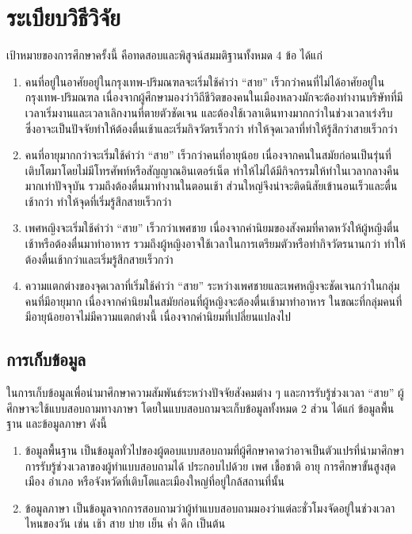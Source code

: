 \documentclass[a4paper]{article}
\begin{document}
\section{ระเบียบวิธีวิจัย}
    เป้าหมายของการศึกษาครั้งนี้ คือทดสอบและพิสูจน์สมมติฐานทั้งหมด 4 ข้อ ได้แก่
    \begin{enumerate}
        \item คนที่อยู่ในอาศัยอยู่ในกรุงเทพ-ปริมณฑลจะเริ่มใช้คำว่า “สาย” เร็วกว่าคนที่ไม่ได้อาศัยอยู่ในกรุงเทพ-ปริมณฑล เนื่องจากผู้ศึกษามองว่าวิถีชีวิตของคนในเมืองหลวงมักจะต้องทำงานบริษัทที่มีเวลาเริ่มงานและเวลาเลิกงานที่ตายตัวชัดเจน และต้องใช้เวลาเดินทางมากกว่าในช่วงเวลาเร่งรีบ ซึ่งอาจะเป็นปัจจัยทำให้ต้องตื่นเช้าและเริ่มกิจวัตรเร็วกว่า ทำให้จุดเวลาที่ทำให้รู้สึกว่าสายเร็วกว่า
        \item คนที่อายุมากกว่าจะเริ่มใช้คำว่า “สาย” เร็วกว่าคนที่อายุน้อย เนื่องจากคนในสมัยก่อนเป็นรุ่นที่เติบโตมาโดยไม่มีโทรศัพท์หรือสัญญาณอินเตอร์เน็ต ทำให้ไม่ได้มีกิจกรรมให้ทำในเวลากลางคืนมากเท่าปัจจุบัน รวมถึงต้องตื่นมาทำงานในตอนเช้า ส่วนใหญ่จึงน่าจะติดนิสัยเข้านอนเร็วและตื่นเช้ากว่า ทำให้จุดที่เริ่มรู้สึกสายเร็วกว่า
        \item เพศหญิงจะเริ่มใช้คำว่า “สาย” เร็วกว่าเพศชาย เนื่องจากค่านิยมของสังคมที่คาดหวังให้ผู้หญิงตื่นเช้าหรือต้องตื่นมาทำอาหาร รวมถึงผู้หญิงอาจใช้เวลาในการเตรียมตัวหรือทำกิจวัตรนานกว่า ทำให้ต้องตื่นเช้ากว่าและเริ่มรู้สึกสายเร็วกว่า
        \item ความแตกต่างของจุดเวลาที่เริ่มใช้คำว่า “สาย” ระหว่างเพศชายและเพศหญิงจะชัดเจนกว่าในกลุ่มคนที่มีอายุมาก เนื่องจากค่านิยมในสมัยก่อนที่ผู้หญิงจะต้องตื่นเช้ามาทำอาหาร ในขณะที่กลุ่มคนที่มีอายุน้อยอาจไม่มีความแตกต่างนี้ เนื่องจากค่านิยมที่เปลี่ยนแปลงไป
    \end{enumerate}
\subsection{การเก็บข้อมูล}
    ในการเก็บข้อมูลเพื่อนำมาศึกษาความสัมพันธ์ระหว่างปัจจัยสังคมต่าง ๆ และการรับรู้ช่วงเวลา “สาย” ผู้ศึกษาจะใช้แบบสอบถามทางภาษา โดยในแบบสอบถามจะเก็บข้อมูลทั้งหมด 2 ส่วน ได้แก่ ข้อมูลพื้นฐาน และข้อมูลภาษา ดังนี้
    \begin{enumerate}
        \item ข้อมูลพื้นฐาน เป็นข้อมูลทั่วไปของผู้ตอบแบบสอบถามที่ผู้ศึกษาคาดว่าอาจเป็นตัวแปรที่นำมาศึกษาการรับรู้ช่วงเวลาของผู้ทำแบบสอบถามได้ ประกอบไปด้วย เพศ เชื้อชาติ อายุ การศึกษาขั้นสูงสุด เมือง อำเภอ หรือจังหวัดที่เติบโตและเมืองใหญ่ที่อยู่ใกล้สถานที่นั้น
        \item ข้อมูลภาษา เป็นข้อมูลจากการสอบถามว่าผู้ทำแบบสอบถามมองว่าแต่ละชั่วโมงจัดอยู่ในช่วงเวลาไหนของวัน เช่น เช้า สาย บ่าย เย็น ค่ำ ดึก เป็นต้น
    \end{enumerate}
\end{document}
